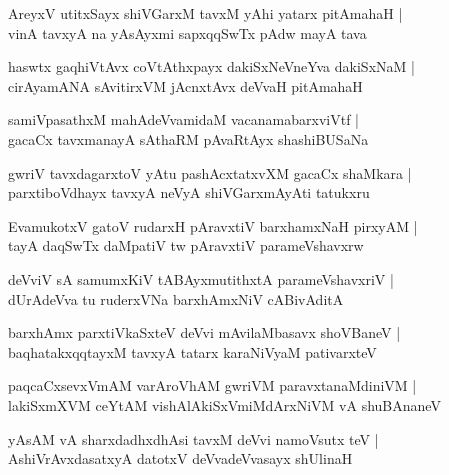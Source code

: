 \begin{shloka}
AreyxV utitxSayx shiVGarxM tavxM yAhi yatarx pitAmahaH |\\
vinA tavxyA na yAsAyxmi sapxqqSwTx pAdw mayA tava
\end{shloka}

\begin{shloka}
haswtx gaqhiVtAvx coVtAthxpayx dakiSxNeVneYva dakiSxNaM |\\
cirAyamANA sAvitirxVM jAcnxtAvx deVvaH pitAmahaH 
\end{shloka}

\begin{shloka}
samiVpasathxM mahAdeVvamidaM vacanamabarxviVtf |\\
gacaCx tavxmanayA sAthaRM pAvaRtAyx shashiBUSaNa
\end{shloka}

\begin{shloka}
gwriV tavxdagarxtoV yAtu pashAcxtatxvXM gacaCx shaMkara |\\
parxtiboVdhayx tavxyA neVyA shiVGarxmAyAti tatukxru 
\end{shloka}

\begin{shloka}
EvamukotxV gatoV rudarxH pAravxtiV barxhamxNaH pirxyAM |\\
tayA daqSwTx daMpatiV tw pAravxtiV parameVshavxrw
\end{shloka}

\begin{shloka}
deVviV sA samumxKiV tABAyxmutithxtA parameVshavxriV |\\
dUrAdeVva tu ruderxVNa barxhAmxNiV cABivAditA
\end{shloka}

\begin{shloka}
barxhAmx parxtiVkaSxteV deVvi mAvilaMbasavx shoVBaneV |\\
baqhatakxqqtayxM tavxyA tatarx karaNiVyaM pativarxteV
\end{shloka}

\begin{shloka}
paqcaCxsevxVmAM varAroVhAM gwriVM paravxtanaMdiniVM |\\
lakiSxmXVM ceYtAM vishAlAkiSxVmiMdArxNiVM vA shuBAnaneV 
\end{shloka}

\begin{shloka}
yAsAM vA sharxdadhxdhAsi tavxM deVvi namoVsutx teV |\\
AshiVrAvxdasatxyA datotxV deVvadeVvasayx shUlinaH 
\end{shloka}

